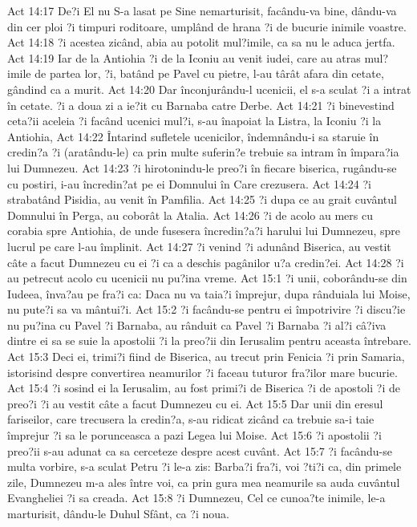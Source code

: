 Act 14:17  De?i El nu S-a lasat pe Sine nemarturisit, facându-va bine, dându-va din cer ploi ?i timpuri roditoare, umplând de hrana ?i de bucurie inimile voastre.
Act 14:18  ?i acestea zicând, abia au potolit mul?imile, ca sa nu le aduca jertfa.
Act 14:19  Iar de la Antiohia ?i de la Iconiu au venit iudei, care au atras mul?imile de partea lor, ?i, batând pe Pavel cu pietre, l-au târât afara din cetate, gândind ca a murit.
Act 14:20  Dar înconjurându-l ucenicii, el s-a sculat ?i a intrat în cetate. ?i a doua zi a ie?it cu Barnaba catre Derbe.
Act 14:21  ?i binevestind ceta?ii aceleia ?i facând ucenici mul?i, s-au înapoiat la Listra, la Iconiu ?i la Antiohia,
Act 14:22  Întarind sufletele ucenicilor, îndemnându-i sa staruie în credin?a ?i (aratându-le) ca prin multe suferin?e trebuie sa intram în împara?ia lui Dumnezeu.
Act 14:23  ?i hirotonindu-le preo?i în fiecare biserica, rugându-se cu postiri, i-au încredin?at pe ei Domnului în Care crezusera.
Act 14:24  ?i strabatând Pisidia, au venit în Pamfilia.
Act 14:25  ?i dupa ce au grait cuvântul Domnului în Perga, au coborât la Atalia.
Act 14:26  ?i de acolo au mers cu corabia spre Antiohia, de unde fusesera încredin?a?i harului lui Dumnezeu, spre lucrul pe care l-au împlinit.
Act 14:27  ?i venind ?i adunând Biserica, au vestit câte a facut Dumnezeu cu ei ?i ca a deschis pagânilor u?a credin?ei.
Act 14:28  ?i au petrecut acolo cu ucenicii nu pu?ina vreme.
Act 15:1  ?i unii, coborându-se din Iudeea, înva?au pe fra?i ca: Daca nu va taia?i împrejur, dupa rânduiala lui Moise, nu pute?i sa va mântui?i.
Act 15:2  ?i facându-se pentru ei împotrivire ?i discu?ie nu pu?ina cu Pavel ?i Barnaba, au rânduit ca Pavel ?i Barnaba ?i al?i câ?iva dintre ei sa se suie la apostolii ?i la preo?ii din Ierusalim pentru aceasta întrebare.
Act 15:3  Deci ei, trimi?i fiind de Biserica, au trecut prin Fenicia ?i prin Samaria, istorisind despre convertirea neamurilor ?i faceau tuturor fra?ilor mare bucurie.
Act 15:4  ?i sosind ei la Ierusalim, au fost primi?i de Biserica ?i de apostoli ?i de preo?i ?i au vestit câte a facut Dumnezeu cu ei.
Act 15:5  Dar unii din eresul fariseilor, care trecusera la credin?a, s-au ridicat zicând ca trebuie sa-i taie împrejur ?i sa le porunceasca a pazi Legea lui Moise.
Act 15:6  ?i apostolii ?i preo?ii s-au adunat ca sa cerceteze despre acest cuvânt.
Act 15:7  ?i facându-se multa vorbire, s-a sculat Petru ?i le-a zis: Barba?i fra?i, voi ?ti?i ca, din primele zile, Dumnezeu m-a ales între voi, ca prin gura mea neamurile sa auda cuvântul Evangheliei ?i sa creada.
Act 15:8  ?i Dumnezeu, Cel ce cunoa?te inimile, le-a marturisit, dându-le Duhul Sfânt, ca ?i noua.
